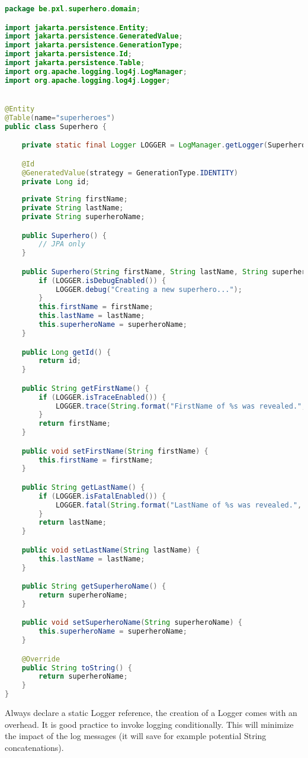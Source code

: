 \begin{lstlisting}[language=java, frame=single]
package be.pxl.superhero.domain;

import jakarta.persistence.Entity;
import jakarta.persistence.GeneratedValue;
import jakarta.persistence.GenerationType;
import jakarta.persistence.Id;
import jakarta.persistence.Table;
import org.apache.logging.log4j.LogManager;
import org.apache.logging.log4j.Logger;


@Entity
@Table(name="superheroes")
public class Superhero {

	private static final Logger LOGGER = LogManager.getLogger(Superhero.class);

	@Id
	@GeneratedValue(strategy = GenerationType.IDENTITY)
	private Long id;
	
	private String firstName;
	private String lastName;
	private String superheroName;

	public Superhero() {
		// JPA only
	}

	public Superhero(String firstName, String lastName, String superheroName) {
		if (LOGGER.isDebugEnabled()) {
			LOGGER.debug("Creating a new superhero...");
		}
		this.firstName = firstName;
		this.lastName = lastName;
		this.superheroName = superheroName;
	}

	public Long getId() {
		return id;
	}

	public String getFirstName() {
		if (LOGGER.isTraceEnabled()) {
			LOGGER.trace(String.format("FirstName of %s was revealed.", superheroName));
		}
		return firstName;
	}

	public void setFirstName(String firstName) {
		this.firstName = firstName;
	}

	public String getLastName() {
		if (LOGGER.isFatalEnabled()) {
			LOGGER.fatal(String.format("LastName of %s was revealed.", superheroName));
		}
		return lastName;
	}

	public void setLastName(String lastName) {
		this.lastName = lastName;
	}

	public String getSuperheroName() {
		return superheroName;
	}

	public void setSuperheroName(String superheroName) {
		this.superheroName = superheroName;
	}

	@Override
	public String toString() {
		return superheroName;
	}
}
\end{lstlisting}

Always declare a static Logger reference, the creation of a Logger comes with an overhead. 
It is good practice to invoke logging conditionally. This will minimize the impact of the log messages (it will save for example potential String concatenations).

